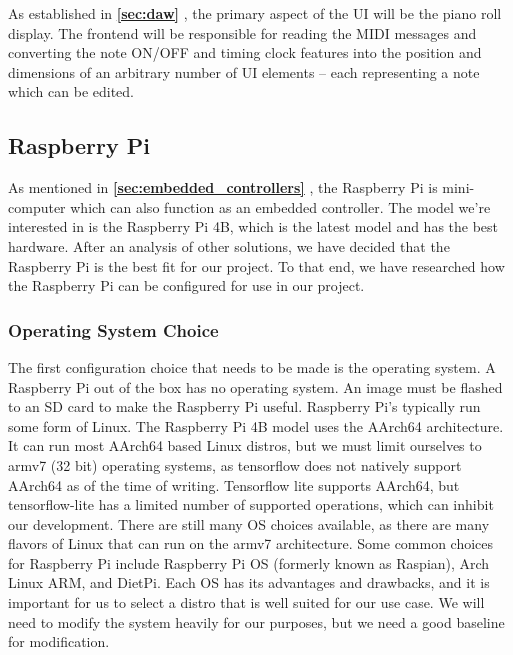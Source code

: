 As established in \textbf{\ref{sec:daw} }, the primary aspect of the UI
will be the piano roll display. The frontend will be responsible for reading the MIDI
messages and converting the note ON/OFF and timing clock features into the position and
dimensions of an arbitrary number of UI elements -- each representing a note which can be
edited.

\subsection{Raspberry Pi}

As mentioned in \textbf{\ref{sec:embedded_controllers} },
the Raspberry Pi is mini-computer which can also function as an embedded controller. The
model we're interested in is the Raspberry Pi 4B, which is the latest model and has the
best hardware. After an analysis of other solutions, we have decided that the
Raspberry Pi is the best fit for our project. To that end, we have researched how the
Raspberry Pi can be configured for use in our project.

\subsubsection{Operating System Choice}

The first configuration choice that needs to be made is the operating system. A Raspberry
Pi out of the box has no operating system. An image must be flashed to an SD card to make
the Raspberry Pi useful. Raspberry Pi's typically run some form of Linux. The Raspberry Pi
4B model uses the AArch64 architecture. It can run most AArch64 based Linux distros, but
we must limit ourselves to armv7 (32 bit) operating systems, as tensorflow does not
natively support AArch64 as of the time of writing. Tensorflow lite supports AArch64, but
tensorflow-lite has a limited number of supported operations, which can inhibit our
development. There are still many OS choices available, as there are many flavors of Linux
that can run on the armv7 architecture. Some common choices for Raspberry Pi include
Raspberry Pi OS (formerly known as Raspian), Arch Linux ARM, and DietPi. Each OS has its
advantages and drawbacks, and it is important for us to select a distro that is well
suited for our use case. We will need to modify the system heavily for our purposes, but
we need a good baseline for modification.

